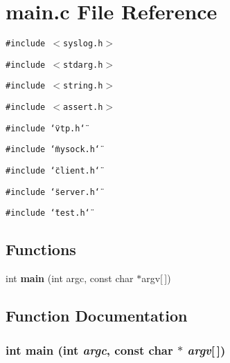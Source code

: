 \section{main.c File Reference}
\label{main_8c}
{\tt \#include $<$syslog.h$>$}\par
{\tt \#include $<$stdarg.h$>$}\par
{\tt \#include $<$string.h$>$}\par
{\tt \#include $<$assert.h$>$}\par
{\tt \#include \char`\"{}vtp.h\char`\"{}}\par
{\tt \#include \char`\"{}mysock.h\char`\"{}}\par
{\tt \#include \char`\"{}client.h\char`\"{}}\par
{\tt \#include \char`\"{}server.h\char`\"{}}\par
{\tt \#include \char`\"{}test.h\char`\"{}}\par
\subsection*{Functions}
\begin{CompactItemize}
\item 
int {\bf main} (int argc, const char $\ast$argv[$\,$])
\end{CompactItemize}


\subsection{Function Documentation}
\subsubsection{\setlength{\rightskip}{0pt plus 5cm}int main (int {\em argc}, const char $\ast$ {\em argv}[$\,$])}\label{main_8c_a0}


